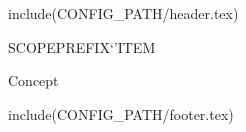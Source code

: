 include(CONFIG_PATH/header.tex)
\begin{ccRefClass}SCOPE{PREFIX`'ITEM}  %


\ccDefinition
  



\ccIsModel

Concept

\ccTypes





\end{ccRefClass}

include(CONFIG_PATH/footer.tex)
